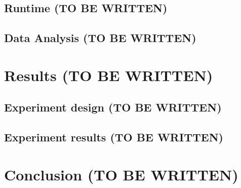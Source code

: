 \documentclass[12pt]{article}
\theoremstyle{definition}
\begin{document}
\subsection{Runtime (TO BE WRITTEN)}

\subsection{Data Analysis (TO BE WRITTEN)}

\section{Results (TO BE WRITTEN)}

\subsection{Experiment design (TO BE WRITTEN)}

\subsection{Experiment results (TO BE WRITTEN)}

\section{Conclusion (TO BE WRITTEN)}

\newpage


\nocite{*}

\end{document}
